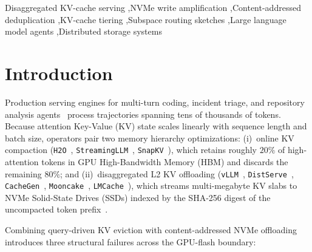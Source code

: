\documentclass[final,5p,times,twocolumn]{elsarticle}
\theoremstyle{definition}
\theoremstyle{remark}
\begin{document}
\begin{frontmatter}
\begin{keyword}
Disaggregated KV-cache serving \sep NVMe write amplification \sep Content-addressed deduplication \sep KV-cache tiering \sep Subspace routing sketches \sep Large language model agents \sep Distributed storage systems
\end{keyword}

\end{frontmatter}

\section{Introduction}

Production serving engines for multi-turn coding, incident triage, and repository analysis agents~\cite{jimenez2024swebench,zheng2024sglang} process trajectories spanning tens of thousands of tokens. Because attention Key-Value (KV) state scales linearly with sequence length and batch size, operators pair two memory hierarchy optimizations: (i)~online KV compaction (\texttt{H2O}~\cite{zhang2023h2o}, \texttt{StreamingLLM}~\cite{xiao2024streamingllm}, \texttt{SnapKV}~\cite{li2024snapkv}), which retains roughly $20\%$ of high-attention tokens in GPU High-Bandwidth Memory (HBM) and discards the remaining $80\%$; and (ii)~disaggregated L2 KV offloading (\texttt{vLLM}~\cite{kwon2023vllm}, \texttt{DistServe}~\cite{zhong2024distserve}, \texttt{CacheGen}~\cite{liu2024cachegen}, \texttt{Mooncake}~\cite{qin2025mooncake}, \texttt{LMCache}~\cite{cheng2025lmcache}), which streams multi-megabyte KV slabs to NVMe Solid-State Drives (SSDs) indexed by the SHA-256 digest of the uncompacted token prefix~\cite{quinlan2002venti}.

Combining query-driven KV eviction with content-addressed NVMe offloading introduces three structural failures across the GPU-flash boundary:
\end{document}
